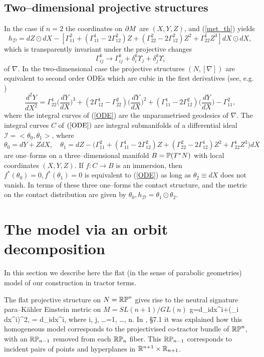 \subsection{Two--dimensional projective structures}
In the case if $n=2$ the coordinates on $\partial M$ are $(X, Y, Z)$,  and (\ref{met_th}) yields
\[
h_{\mathcal D}=dZ\odot dX-[\Gamma_{11}^2+(\Gamma_{11}^1-2\Gamma_{12}^2)Z+(\Gamma_{22}^2-2\Gamma_{12}^2)Z^2+
\Gamma_{22}^1Z^3]dX\odot dX,
\]
which is transparently invariant under the projective changes 
\[
\Gamma_{ij}^k\longrightarrow \Gamma_{ij}^k+\delta^k_i\Upsilon_j+\delta^k_j\Upsilon_i
\]
of $\nabla$.
In the  two-dimensional case the 
projective
structures $(N, [\nabla])$ are equivalent to second order ODEs which are cubic in
the first derivatives (see, e.g. \cite{BDE})
\begin{equation}
\label{ODE}
\frac{d^2 Y}{d X^2}=\Gamma^1_{22}\Big(\frac{d Y}{d X}\Big)^3
+(2\Gamma^1_{12}-\Gamma^2_{22})\Big(\frac{d Y}{d X}\Big)^2
+(\Gamma^1_{11}-2\Gamma^2_{12})\Big(\frac{d Y}{d X}\Big)-
\Gamma^2_{11},
\end{equation}
where the integral curves of (\ref{ODE}) are the unparametrised geodesics of $\nabla$. 
The integral curves $C$ of $(\ref{ODE})$ are integral submanifolds
of a  differential
ideal ${\mathcal I}=<\theta_0, \theta_1>$, where
\[
\theta_0=dY+ZdX, \quad \theta_1=dZ-\Big(\Gamma_{11}^2+(\Gamma_{11}^1-2\Gamma_{12}^2)Z+(\Gamma_{22}^2-2\Gamma_{12}^1)Z^2+
\Gamma_{22}^1Z^3\Big)dX
\]
are one--forms on a three--dimensional manifold $B=\mathbb{P}(T^*N)$ with local coordinates $(X, Y, Z)$. If $f:C\rightarrow B$ is an immersion, then $f^*(\theta_0)=0, f^*(\theta_1)=0$ is equivalent
to (\ref{ODE}) as long as $\theta_2\equiv dX$ does not vanish. In terms of these three one--forms
the contact structure, and the metric on the contact distribution are given by
$
\theta_0,  h_{\mathcal D}=\theta_1\odot\theta_2.
$



\section{The model via an orbit decomposition}

In this section we describe here the flat (in the sense of parabolic
geometries) model \cite{CDT13, DM} of our construction in tractor
terms.

The flat projective structure on $N=\mathbb{RP}^n$ gives rise to 
the neutral signature para--K\"ahler Einstein metric on $M=SL(n+1)/GL(n)$
\be
\label{DM_metric}
g=d\xi_i\odot dx^i+(\xi_i dx^i)^2, \quad \Omega= d\xi_i\wedge dx^i, \quad\mbox{where}\quad
i, j, \dots =1, \dots, n.
\ee
In \cite{DM}, \S 7.1 it was explained how this homogeneous model
corresponds to the projectivised co-tractor bundle of $\mathbb{RP}^n$, with
an $\mathbb{RP}_{n-1}$ removed from each $\mathbb{RP}_n$ fiber. This $\mathbb{RP}_{n-1}$
corresponds to incident pairs of points and hyperplanes in $\mathbb{R}^{n+1}\times\mathbb{R}_{n+1}$.


